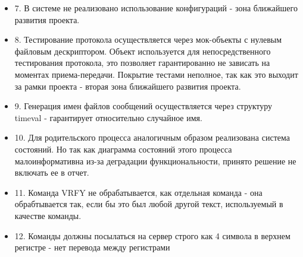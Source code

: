 \documentclass[a4paper,12pt]{report}
\begin{document}
\begin{itemize}
    \item 7. В системе не реализовано использование конфигураций - зона ближайшего развития проекта.
    \item 8. Тестирование протокола осуществляется через мок-объекты с нулевым файловым дескриптором. Объект используется для непосредственного тестирования протокола, это позволяет гарантированно не зависать на моментах приема-передачи. Покрытие тестами неполное, так как это выходит за рамки проекта - вторая зона ближайшего развития проекта.
    \item 9. Генерация имен файлов сообщений осуществляется через структуру timeval - гарантирует относительно случайное имя.
    \item 10. Для родительского процесса аналогичным образом реализована система состояний. Но так как диаграмма состояний этого процесса малоинформативна из-за деградации функциональности, принято решение не включать ее в отчет.
    \item 11. Команда VRFY  не обрабатывается, как отдельная команда - она обрабтывается так, если бы это был любой другой текст, используемый в качестве команды.
    \item 12. Команды должны посылаться на сервер строго как 4 символа в верхнем регистре - нет перевода между регистрами
\end{itemize}
\end{document}
